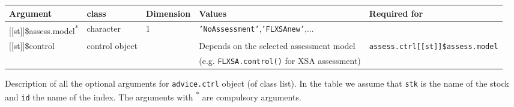 \begin{landscape}
\begin{table}[!ht]
\begin{footnotesize}
    \label{tb:A3.table6}


    \begin{threeparttable}

      \begin{tabular}{lllll} %
        \hline
        Argument & class & Dimension & Values & Required for \\
        \hline
        {[[st]]}\$assess.model\textsuperscript{*} & character & 1 & \texttt{'NoAssessment'},\texttt{'FLXSAnew'},... &  \\
        {[[st]]}\$control & control object &  & Depends on the selected assessment model & \texttt{assess.ctrl[[st]]\$assess.model} \\
         &  &  & (e.g. \texttt{FLXSA.control()} for XSA assessment) &  \\
        \hline
      \end{tabular}

     \end{threeparttable}
  \end{footnotesize}

\end{table}
	

\begin{table}[!ht]

  \centering
  \begin{footnotesize}

    \caption{Description of all the optional arguments for \texttt{advice.ctrl} object (of class list).
    In the table we assume that \texttt{stk} is the name of the stock and \texttt{id} the name of the index.
    The arguments with \textsuperscript{*} are compulsory arguments.}
    
    \label{tb:A3.table7}

    \begin{threeparttable}


\end{threeparttable}
\end{footnotesize}
\end{table}
\end{landscape}
